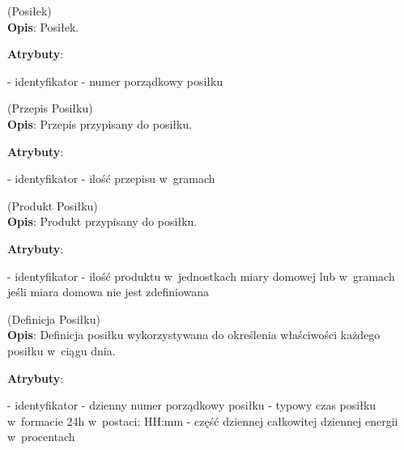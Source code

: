 \begin{enumerate}[label={\textbf{KAT/4/\protect\twodigits{\theenumi}}}, wide, labelwidth=!, labelindent=0pt, labelsep=0pt, series=reqs]
    \label{kat:Meal} (Posiłek)\\
    \indent\textbf{Opis}: Posiłek.
    \par
    \textbf{Atrybuty}:
    \begin{itemize}[series=atr, wide, align=left, leftmargin=190pt]
        \label{kat:Meal:id}- identyfikator
        \label{kat:Meal:ordinalNumber}- numer porządkowy posiłku
    \end{itemize}

    \label{kat:MealRecipe} (Przepis Posiłku)\\
    \indent\textbf{Opis}: Przepis przypisany do posiłku.
    \par
    \textbf{Atrybuty}:
    \begin{itemize}[series=atr, wide, align=left, leftmargin=190pt]
        \label{kat:MealRecipe:id}- identyfikator
        \label{kat:MealRecipe:amount}- ilość przepisu w~gramach
    \end{itemize}

    \label{kat:MealProduct} (Produkt Posiłku)\\
    \indent\textbf{Opis}: Produkt przypisany do posiłku.
    \par
    \textbf{Atrybuty}:
    \begin{itemize}[series=atr, wide, align=left, leftmargin=190pt]
        \label{kat:MealProduct:id}- identyfikator
        \label{kat:MealProduct:amount}- ilość produktu w~jednostkach miary domowej lub w~gramach jeśli miara domowa nie jest zdefiniowana
    \end{itemize}

    \label{kat:MealDefinition} (Definicja Posiłku)\\
    \indent\textbf{Opis}: Definicja posiłku wykorzystywana do określenia właściwości każdego posiłku w~ciągu dnia.
    \par
    \textbf{Atrybuty}:
    \begin{itemize}[series=atr, wide, align=left, leftmargin=190pt]
        \label{kat:MealDefinition:id}- identyfikator
        \label{kat:MealDefinition:ordinalNumber}- dzienny numer porządkowy posiłku
        \label{kat:MealDefinition:timeOfMeal}- typowy czas posiłku w~formacie 24h w~postaci: HH:mm
        \label{kat:MealDefinition:percentOfEnergy}- część dziennej całkowitej dziennej energii w~procentach
    \end{itemize}

\end{enumerate}

